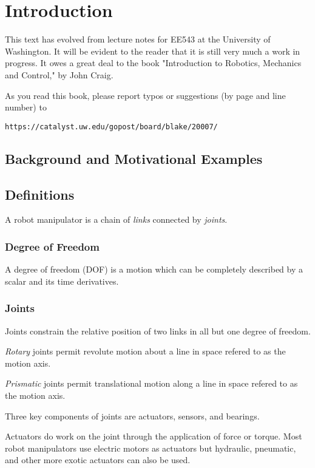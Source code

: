 %

\chapter{Introduction}
This text has evolved from lecture notes for EE543 at the University of Washington.  It will be evident to the reader that it is still very much a work in progress.  It owes a great deal to the book "Introduction to Robotics, Mechanics and Control," by John Craig.

As you read this book, please report typos or suggestions (by page and line number) to

{\tt https://catalyst.uw.edu/gopost/board/blake/20007/}

\section{Background and Motivational Examples}
 
\section{Definitions}

A robot manipulator is a chain of {\it links} connected by {\it joints}.
\subsection{Degree of Freedom}
A degree of freedom (DOF) is a motion which can be completely described by a scalar and its time derivatives. 

\subsection{Joints}
Joints constrain the relative position of two links in all but one degree of freedom. 

{\it Rotary } joints permit revolute motion about a line in space refered to as the motion axis. 

{\it Prismatic} joints  permit translational motion along a line in space refered to as the motion axis. 

Three key components of joints are actuators, sensors, and bearings.  

Actuators do work on the joint through the application of force or torque.  Most robot manipulators use electric motors as actuators but hydraulic, pneumatic, and other more exotic actuators can also be used. 

